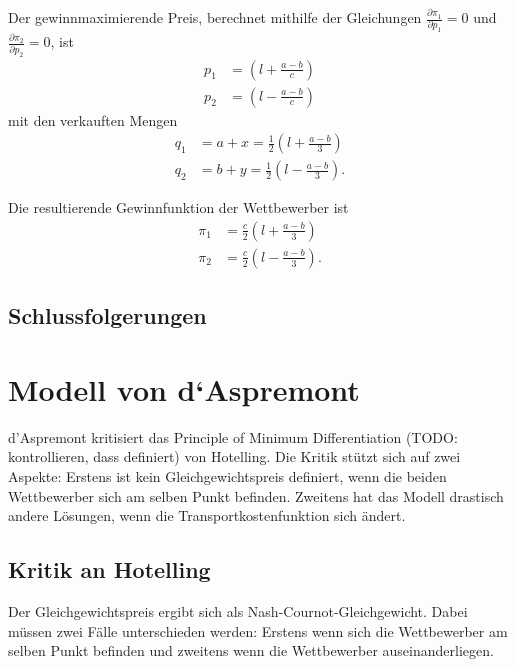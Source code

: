 Der gewinnmaximierende Preis, berechnet mithilfe der Gleichungen $\frac{\partial \pi_1}{\partial p_1}=0$ und $\frac{\partial \pi_2}{\partial p_2}=0$, ist
\begin{equation}
\begin{split}
p_1 &= \left(l+\frac{a-b}{c}\right) \\
p_2 &= \left(l-\frac{a-b}{c}\right)
\end{split}
\end{equation}
mit den verkauften Mengen
\begin{equation}
\begin{split}
q_1 &= a + x = \tfrac{1}{2} \left(l + \frac{a-b}{3}\right) \\
q_2 &= b + y = \tfrac{1}{2} \left(l - \frac{a-b}{3}\right)
.\end{split}
\end{equation}

Die resultierende Gewinnfunktion der Wettbewerber ist
\begin{equation}\label{eqn:Gewinnfunktion}
\begin{split}
\pi_1 &= \frac{c}{2} \left(l+\frac{a-b}{3}\right) \\
\pi_2 &= \frac{c}{2} \left(l-\frac{a-b}{3}\right)
.\end{split}
\end{equation}

\subsection{Schlussfolgerungen}

\section{Modell von d‘Aspremont}\label{Sec-Aspremont}

d'Aspremont \citep{aspremont1979} kritisiert das Principle of Minimum Differentiation (TODO: kontrollieren, dass definiert) von Hotelling.
Die Kritik stützt sich auf zwei Aspekte: Erstens ist kein Gleichgewichtspreis definiert, wenn die beiden Wettbewerber sich am selben Punkt befinden. Zweitens hat das Modell drastisch andere Lösungen, wenn die Transportkostenfunktion sich ändert.

\subsection{Kritik an Hotelling}
Der Gleichgewichtspreis ergibt sich als Nash-Cournot-Gleichgewicht. Dabei müssen zwei Fälle unterschieden werden: Erstens wenn sich die Wettbewerber am selben Punkt befinden und zweitens wenn die Wettbewerber auseinanderliegen.

